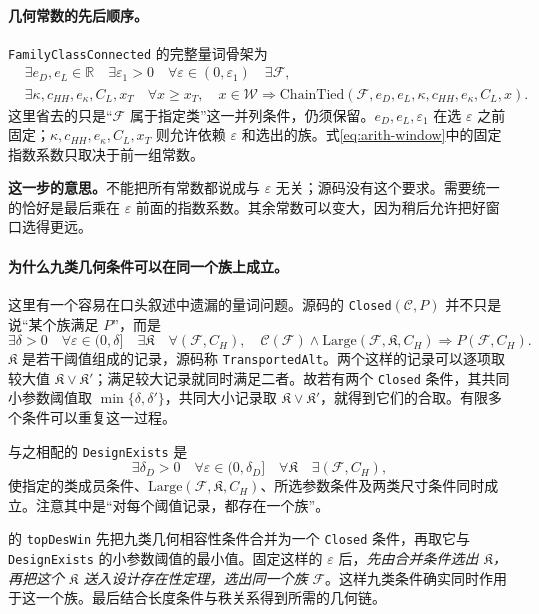 \documentclass[UTF8,fontset=fandol,a4paper,openany,oneside]{ctexbook}
\theoremstyle{definition}
\theoremstyle{remark}
\newcommand{\Expl}[1]{\par\smallskip\noindent\textbf{这一步的意思。}#1\par\smallskip}
\begin{document}
\paragraph{几何常数的先后顺序。}
\texttt{FamilyClassConnected} 的完整量词骨架为
\begin{equation}
\begin{split}
&\exists e_D,e_L\in\mathbb R\quad\exists\varepsilon_1>0\quad
\forall\varepsilon\in(0,\varepsilon_1)\quad\exists\mathcal F,\\
&\exists\kappa,c_{HH},e_\kappa,C_L,x_T\quad
\forall x\ge x_T,\quad
x\in\mathcal W\Longrightarrow
\mathrm{ChainTied}(\mathcal F,e_D,e_L,\kappa,c_{HH},e_\kappa,C_L,x).
\end{split}
\label{eq:arith-tied-quantifiers}
\end{equation}
这里省去的只是“$\mathcal F$ 属于指定类”这一并列条件，仍须保留。$e_D,e_L,\varepsilon_1$ 在选 $\varepsilon$ 之前固定；$\kappa,c_{HH},e_\kappa,C_L,x_T$ 则允许依赖 $\varepsilon$ 和选出的族。式\eqref{eq:arith-window}中的固定指数系数只取决于前一组常数。

\Expl{不能把所有常数都说成与 $\varepsilon$ 无关；源码没有这个要求。需要统一的恰好是最后乘在 $\varepsilon$ 前面的指数系数。其余常数可以变大，因为稍后允许把好窗口选得更远。}

\paragraph{为什么九类几何条件可以在同一个族上成立。}
这里有一个容易在口头叙述中遗漏的量词问题。源码的 \texttt{Closed}$(\mathcal C,P)$ 并不只是说“某个族满足 $P$”，而是
\[
\exists\delta>0\quad\forall\varepsilon\in(0,\delta]
\quad\exists\mathfrak K\quad
\forall(\mathcal F,C_H),\quad
\mathcal C(\mathcal F)\land\mathrm{Large}(\mathcal F,\mathfrak K,C_H)
\Longrightarrow P(\mathcal F,C_H).
\]
$\mathfrak K$ 是若干阈值组成的记录，源码称 \texttt{TransportedAlt}。两个这样的记录可以逐项取较大值 $\mathfrak K\vee\mathfrak K'$；满足较大记录就同时满足二者。故若有两个 \texttt{Closed} 条件，其共同小参数阈值取 $\min\{\delta,\delta'\}$，共同大小记录取 $\mathfrak K\vee\mathfrak K'$，就得到它们的合取。有限多个条件可以重复这一过程。

与之相配的 \texttt{DesignExists} 是
\[
\exists\delta_D>0\quad\forall\varepsilon\in(0,\delta_D]
\quad\forall\mathfrak K\quad\exists(\mathcal F,C_H),
\]
使指定的类成员条件、$\mathrm{Large}(\mathcal F,\mathfrak K,C_H)$、所选参数条件及两类尺寸条件同时成立。注意其中是“对每个阈值记录，都存在一个族”。

 的 \texttt{topDesWin} 先把九类几何相容性条件合并为一个 \texttt{Closed} 条件，再取它与 \texttt{DesignExists} 的小参数阈值的最小值。固定这样的 $\varepsilon$ 后，\emph{先由合并条件选出 $\mathfrak K$，再把这个 $\mathfrak K$ 送入设计存在性定理，选出同一个族 $\mathcal F$}。这样九类条件确实同时作用于这一个族。最后结合长度条件与秩关系得到所需的几何链。
\end{document}
